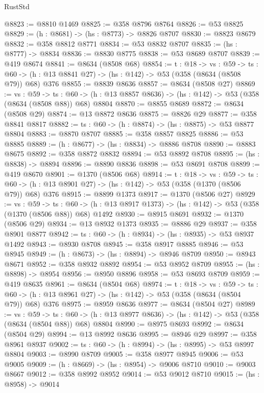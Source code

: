 \begin{lexlean}{RustStd}
\begin{coremodule}
@8823 := @8810 @1469
@8825 := @358 @8796 @8764
@8826 := @53 @8825
@8829 := (h : @8681) -> (hs : @8773) -> @8826 @8707
@8830 := @8823 @8679
@8832 := @358 @8812 @8771
@8834 := @53 @8832 @8707
@8835 := (hs : @8777) -> @8834
@8836 := @8830 @8775
@8838 := @53 @8689 @8707
@8839 := @419 @8674
@8841 := @8634 (@8508 @68)
@8854 := {t : @18} ->
  {vs : @59} ->
  {ts : @60} -> (h : @13 @8841 @27) -> (hs : @142) -> @53 (@358 (@8634 (@8508 @79)) @68) @376
@8855 := @8839 @8636
@8857 := @8634 (@8508 @27)
@8869 := {vs : @59} ->
  {ts : @60} -> (h : @13 @8857 @8636) -> (hs : @142) -> @53 (@358 (@8634 (@8508 @88)) @68) @8804
@8870 := @8855 @8689
@8872 := @8634 (@8508 @29)
@8874 := @13 @8872 @8636
@8875 := @8826 @29
@8877 := @358 @8841 @8817
@8882 := {ts : @60} -> (h : @8874) -> (hs : @8875) -> @53 @8877 @8804
@8883 := @8870 @8707
@8885 := @358 @8857 @8825
@8886 := @53 @8885
@8889 := (h : @8677) -> (hs : @8834) -> @8886 @8708
@8890 := @8883 @8675
@8892 := @358 @8872 @8832
@8894 := @53 @8892 @8708
@8895 := (hs : @8838) -> @8894
@8896 := @8890 @8836
@8898 := @53 @8691 @8708
@8899 := @419 @8670
@8901 := @1370 (@8506 @68)
@8914 := {t : @18} ->
  {vs : @59} ->
  {ts : @60} -> (h : @13 @8901 @27) -> (hs : @142) -> @53 (@358 (@1370 (@8506 @79)) @68) @376
@8915 := @8899 @1373
@8917 := @1370 (@8506 @27)
@8929 := {vs : @59} ->
  {ts : @60} -> (h : @13 @8917 @1373) -> (hs : @142) -> @53 (@358 (@1370 (@8506 @88)) @68) @1492
@8930 := @8915 @8691
@8932 := @1370 (@8506 @29)
@8934 := @13 @8932 @1373
@8935 := @8886 @29
@8937 := @358 @8901 @8877
@8942 := {ts : @60} -> (h : @8934) -> (hs : @8935) -> @53 @8937 @1492
@8943 := @8930 @8708
@8945 := @358 @8917 @8885
@8946 := @53 @8945
@8949 := (h : @8673) -> (hs : @8894) -> @8946 @8709
@8950 := @8943 @8671
@8952 := @358 @8932 @8892
@8954 := @53 @8952 @8709
@8955 := (hs : @8898) -> @8954
@8956 := @8950 @8896
@8958 := @53 @8693 @8709
@8959 := @419 @8635
@8961 := @8634 (@8504 @68)
@8974 := {t : @18} ->
  {vs : @59} ->
  {ts : @60} -> (h : @13 @8961 @27) -> (hs : @142) -> @53 (@358 (@8634 (@8504 @79)) @68) @376
@8975 := @8959 @8636
@8977 := @8634 (@8504 @27)
@8989 := {vs : @59} ->
  {ts : @60} -> (h : @13 @8977 @8636) -> (hs : @142) -> @53 (@358 (@8634 (@8504 @88)) @68) @8804
@8990 := @8975 @8693
@8992 := @8634 (@8504 @29)
@8994 := @13 @8992 @8636
@8995 := @8946 @29
@8997 := @358 @8961 @8937
@9002 := {ts : @60} -> (h : @8994) -> (hs : @8995) -> @53 @8997 @8804
@9003 := @8990 @8709
@9005 := @358 @8977 @8945
@9006 := @53 @9005
@9009 := (h : @8669) -> (hs : @8954) -> @9006 @8710
@9010 := @9003 @8667
@9012 := @358 @8992 @8952
@9014 := @53 @9012 @8710
@9015 := (hs : @8958) -> @9014

\end{coremodule}
\end{lexlean}
